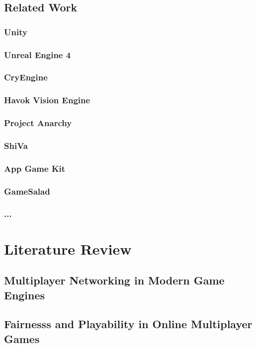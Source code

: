 \documentclass[bsc,frontabs,twoside,singlespacing,parskip,deptreport]{infthesis}     %
\begin{document}
\section{Related Work}
\subsection{Unity}
\subsection{Unreal Engine 4}
\subsection{CryEngine}
\subsection{Havok Vision Engine}
\subsection{Project Anarchy}
\subsection{ShiVa}
\subsection{App Game Kit}
\subsection{GameSalad}
\subsection{...}






\chapter{Literature Review}

\section{Multiplayer Networking in Modern Game Engines}

\section{Fairnesss and Playability in Online Multiplayer Games}
\end{document}
